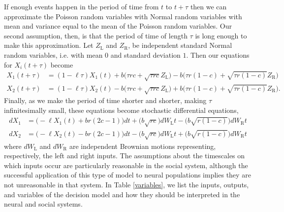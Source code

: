 \documentclass{article}
\begin{document}
If enough events happen in the period of time from $t$ to $t+\tau$ then we can approximate the Poisson random variables with Normal random variables with mean and variance equal to the mean of the Poisson random variables.  Our second assumption, then, is that the period of time of length $\tau$ is long enough to make this approximation. Let $Z_\text{L}$ and $Z_\text{R}$, be independent standard Normal random variables, i.e. with mean $0$ and standard deviation $1$.  Then our equations for $X_i(t+\tau)$ become
\begin{align*}
X_1(t+\tau)&=(1-\ell\tau)X_1(t)+b\bigg(\tau rc+\sqrt{\tau rc}Z_{\text{L}}\bigg)-b\bigg(\tau r(1-c)+\sqrt{\tau r(1-c)}Z_{\text{R}}\bigg)
\\X_2(t+\tau)&=(1-\ell\tau)X_2(t)-b\bigg(\tau rc+\sqrt{\tau rc}Z_{\text{L}}\bigg)+b\bigg(\tau r(1-c)+\sqrt{\tau r(1-c)}Z_{\text{R}}\bigg).
\end{align*}
Finally, as we make the period of time shorter and shorter, making $\tau$ infinitesimally small, these equations become stochastic differential equations,
\begin{equation}
\begin{array}{ll}
dX_1&=\bigg(-\ell X_1(t)+br(2c-1)\bigg)dt+\bigg(b\sqrt{rc}\bigg)dW_\text{L}t-\bigg(b\sqrt{r(1-c)}\bigg)dW_\text{R}t
\\dX_2&=\bigg(-\ell X_2(t)-br(2c-1)\bigg)dt-\bigg(b\sqrt{rc}\bigg)dW_\text{L}t+\bigg(b\sqrt{r(1-c)}\bigg)dW_\text{R}t
\end{array}
\end{equation}
where $dW_{\text{L}}$ and $dW_{\text{R}}$ are independent Brownian motions representing, respectively, the left and right inputs.  The assumptions about the timescales on which inputs occur are particularly reasonable in the social system, although the successful application of this type of model to neural populations implies they are not unreasonable in that system.  In Table \ref{variables}, we list the inputs, outputs, and variables of the decision model and how they should be interpreted in the neural and social systems.
\end{document}
